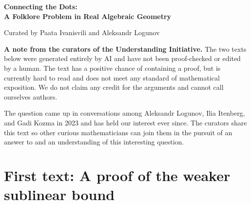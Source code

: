 \documentclass[11pt,letterpaper]{article}
\begin{document}
\begin{center}
{\LARGE\bfseries Connecting the Dots:\\[3pt]
A Folklore Problem in Real Algebraic Geometry}\par\medskip
Curated by Paata Ivanisvili and Aleksandr Logunov
\end{center}

\begin{abstract}
Given $n$ points in the Euclidean plane, what is the smallest possible total degree of a nonzero real polynomial in two variables whose zero set has a connected component containing all $n$ points?
This folklore question appears to go back at least to Dmitry Gudkov and Vladimir Rokhlin.
As of November 18, 2026, we did not know whether every set of $n$ points in the Euclidean plane can be contained in a single connected component of the zero set of a nonzero real polynomial of degree $o(n)$, although it has been conjectured that degree $O(\sqrt{n})$ suffices.
On November 19, 2026, AI, prompted by the curators, generated two texts claiming that both bounds hold.
\end{abstract}

\noindent\textbf{A note from the curators of the Understanding Initiative.} The two texts below were generated entirely by AI and have not been proof-checked or edited by a human. The text has a positive chance of containing a proof, but is currently hard to read and does not meet any standard of mathematical exposition. We do not claim any credit for the arguments and cannot call ourselves authors.

\smallskip
\noindent The question came up in conversations among Aleksandr Logunov, Ilia Itenberg, and Gadi Kozma in 2023 and has held our interest ever since.
The curators share this text so other curious mathematicians can join them in the pursuit of an answer to and an understanding of this interesting question.

\vspace{-\baselineskip}
\enlargethispage{\baselineskip}
\part{First text: A proof of the weaker sublinear bound}
\label{part:weak}
\begin{abstract}
Let $D(n)$ be the least total degree sufficient to put any $n$ points of the Euclidean plane on a single connected component of the zero set of a nonzero real polynomial. This text gives an argument for $D(n)=o(n)$ by using crossings of interpolating curves to merge groups of prescribed points.
\end{abstract}
\end{document}
